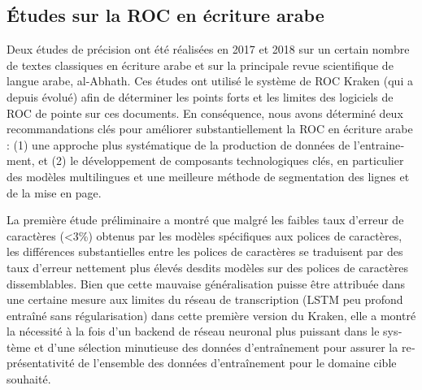 \begin{french}
\section{Études sur la ROC en écriture arabe}

Deux études de précision ont été réalisées en 2017 et 2018 sur un certain nombre de textes classiques en écriture
arabe et sur la principale revue scientifique de langue arabe, al-Abhath. Ces études ont utilisé le système de ROC Kraken (qui a depuis évolué) afin de déterminer les points forts et les limites des logiciels de ROC de pointe sur ces documents. En
conséquence, nous avons déterminé deux recommandations clés pour améliorer
substantiellement la ROC en écriture arabe : (1) une approche plus systématique
de la production de données de l'entrainement, et (2) le développement de
composants technologiques clés, en particulier des modèles multilingues et une
meilleure méthode de segmentation des lignes et de la mise en page.

La première étude préliminaire a montré que malgré les faibles taux d'erreur de
caractères (<3\%) obtenus par les modèles spécifiques aux polices de
caractères, les différences substantielles entre les polices de caractères se
traduisent par des taux d'erreur nettement plus élevés desdits modèles sur des
polices de caractères dissemblables. Bien que cette mauvaise généralisation
puisse être attribuée dans une certaine mesure aux limites du réseau de
transcription (LSTM peu profond entraîné sans régularisation) dans cette
première version du Kraken, elle a montré la nécessité à la fois d'un backend
de réseau neuronal plus puissant dans le système et d'une sélection minutieuse
des données d'entraînement pour assurer la représentativité de l'ensemble des
données d'entraînement pour le domaine cible souhaité.


\end{french}
